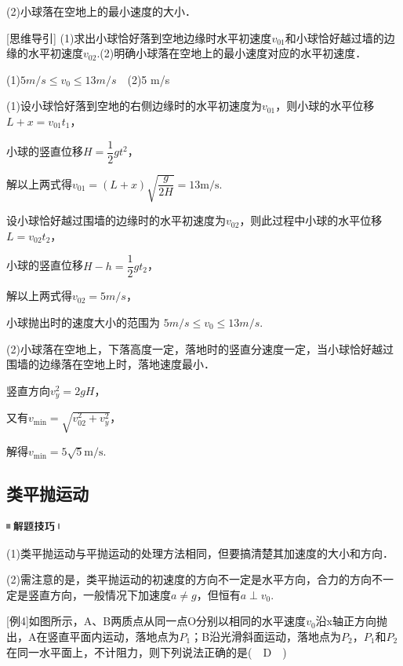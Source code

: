 (2)小球落在空地上的最小速度的大小．

{[}思维导引{]}
(1)求出小球恰好落到空地边缘时水平初速度$v_{01}$和小球恰好越过墙的边缘的水平初速度$v_{02}$.(2)明确小球落在空地上的最小速度对应的水平初速度．
\begin{solution}(1)$5 m/s\leq v_0\leq 13 m/s$　(2)5 m/s

	(1)设小球恰好落到空地的右侧边缘时的水平初速度为$v_{01}$，则小球的水平位移$L+x=v_{01}t_1$，

小球的竖直位移$H=\dfrac{1}{2} g t^{2}$，

解以上两式得$v_{01}=(L+x) \sqrt{\dfrac{g}{2 H}}=13 \mathrm{m} / \mathrm{s}$.

设小球恰好越过围墙的边缘时的水平初速度为$v_{02}$，则此过程中小球的水平位移$L=v_{02}t_2$，

小球的竖直位移$H-h=\dfrac{1}{2} g t_{2}$，

解以上两式得$v_{02}=5 m/s$，

小球抛出时的速度大小的范围为 $5 m/s\leq v_0\leq 13 m/s$.

(2)小球落在空地上，下落高度一定，落地时的竖直分速度一定，当小球恰好越过围墙的边缘落在空地上时，落地速度最小．

竖直方向$v_{y}^{2}=2 g H$，

又有$v_{\min }=\sqrt{v_{02}^{2}+v_{y}^{2}}$，

解得$v_{\min }=5 \sqrt{5} \mathrm{m} / \mathrm{s}$.


\end{solution}

\newpage
\subsection{类平抛运动}

\begin{center}\includegraphics[width=0.70833in,height=0.125in]{media/image37.png}\end{center}

(1)类平抛运动与平抛运动的处理方法相同，但要搞清楚其加速度的大小和方向．

(2)需注意的是，类平抛运动的初速度的方向不一定是水平方向，合力的方向不一定是竖直方向，一般情况下加速度$a\neq g$，但恒有$a\perp v_0$.

{[}例4{]}如图所示，A、B两质点从同一点O分别以相同的水平速度$v_0$沿x轴正方向抛出，A在竖直平面内运动，落地点为$P_1$；B沿光滑斜面运动，落地点为$P_2$，$P_1$和$P_2$在同一水平面上，不计阻力，则下列说法正确的是(　D　)

